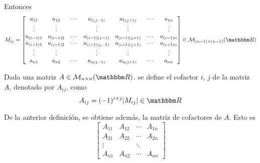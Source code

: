 \begin{definition}
    Entonces
    $$M_{ij} = \begin{bmatrix}
        a_{11} & a_{12} & \cdots & a_{1(j-1)} & a_{1(j+1)} & \cdots & a_{1n} \\
        \vdots & \vdots & & \vdots & \vdots & & \vdots \\
        a_{(i-1)1} & a_{(i-1)2} & \cdots & a_{(i-1)(j-1)} & a_{(i-1)(j+1)} & \cdots & a_{(i-1)n} \\
        a_{(i+1)1} & a_{(i+1)2} & \cdots & a_{(i+1)(j-1)} & a_{(i+1)(j+1)} & \cdots & a_{(i+1)n} \\
        \vdots & \vdots & & \vdots & \vdots & & \vdots \\
        a_{n1} & a_{n2} & \cdots & a_{n(j-1)} & a_{n(j+1)} & \cdots & a_{nn}
    \end{bmatrix} \in \mathcal{M}_{(n-1) \times (n-1)}(\RR)$$
\end{definition}

\begin{definition}
    Dada una matriz $A \in \mathcal{M}_{n \times n}(\RR)$. se define el cofactor $i$, $j$ de la matriz $A$, denotado por $A_{ij}$, como
    $$A_{ij} = (-1)^{i+j} |M_{ij}| \in \RR$$
\end{definition}

\newpage

\begin{observation}
    De la anterior definición, se obtiene además, la matriz de cofactores de $A$. Esto es
    $$\begin{bmatrix}
        A_{11} & A_{12} & \cdots & A_{1n}\\
        A_{21} & A_{22} & \cdots & A_{2n}\\
        \vdots &  & \ddots & \\
        A_{n1} & A_{n2} & \cdots & A_{nn}
    \end{bmatrix}$$
\end{observation}


